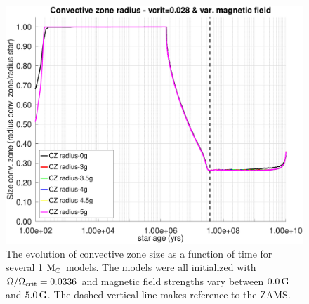 \documentclass[fleqn,usenatbib]{mnras}
\begin{document}
\par

\begin{figure}
	\includegraphics[trim = 15mm 10mm 15mm 10mm, clip,width=\columnwidth]{figures/cz_vc_028_var_g.eps}
    \caption{The evolution of convective zone size as a function of time for several 1 $\mathrm{M}_\odot$ models. The models were all initialized with $\Omega / \Omega_{\mathrm{crit}}=0.0336$ and magnetic field strengths vary between $0.0\,\mathrm{G}$ and $5.0\,\mathrm{G}$. The dashed vertical line makes reference to the ZAMS.}
    \label{fig:cz_vc_028_var_b}
\end{figure}
\end{document}

